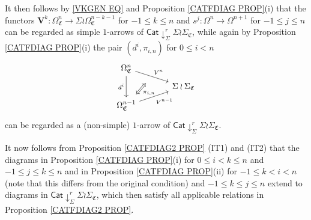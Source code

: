 \documentclass[a4paper,10pt
,draft
]{article}%
\renewcommand{\1}{\eta}%
\begin{document}
It then follows by \eqref{VKGEN EQ} and Proposition \ref{CATFDIAG PROP}(i) that the functors
$\boldsymbol{V}^k \colon \Omega^n_{\mathfrak{C}} \to \Sigma \wr \Omega^{n-k-1}_{\mathfrak{C}}$
for $-1\leq k \leq n$
and $s^j \colon \Omega^n \to \Omega^{n+1}$
for $-1 \leq j \leq n$
can be regarded as simple $1$-arrows of 
$\mathsf{Cat} \downarrow^r_{\Sigma} \Sigma \wr \Sigma_{\mathfrak{C}}$,
while again by Proposition \ref{CATFDIAG PROP}(i)
the pair $(d^i,\pi_{i,n})$ for $0 \leq i < n$
\begin{equation}
\begin{tikzcd}[row sep = tiny, column sep = 35pt]
	\Omega^n_{\mathfrak{C}}
	\arrow{dr}[swap,name=U]{}{V^n} \arrow{dd}[swap]{d^i} \\
	& \Sigma \wr \Sigma_{\mathfrak{C}}
\\
	|[alias=V]|
	\Omega^{n-1}_{\mathfrak{C}} \arrow{ur}[swap]{V^{n-1}} \arrow[Leftrightarrow, from=V, to=U,shorten >=0.15cm,shorten <=0.15cm
,swap,"\pi_{i,n}"
]
\end{tikzcd}
\end{equation}
can be regarded as a (non-simple) $1$-arrow of 
$\mathsf{Cat} \downarrow^r_{\Sigma} \Sigma \wr \Sigma_{\mathfrak{C}}$.

It now follows from 
Proposition \ref{CATFDIAG2 PROP} (IT1) and (IT2)
that the diagrams in Proposition \ref{CATFDIAG PROP}(i)
for $0 \leq i < k \leq n$ and $-1\leq j\leq k \leq n$
and in Proposition \ref{CATFDIAG PROP}(ii)
for $-1\leq k < i < n$ (note that this differs from the original condition)
and $-1\leq k \leq j \leq n$
extend to diagrams in 
$\mathsf{Cat} \downarrow^r_{\Sigma} \Sigma \wr \Sigma_{\mathfrak{C}}$,
which then satisfy all applicable relations in
Proposition \ref{CATFDIAG2 PROP}. 
\end{document}
